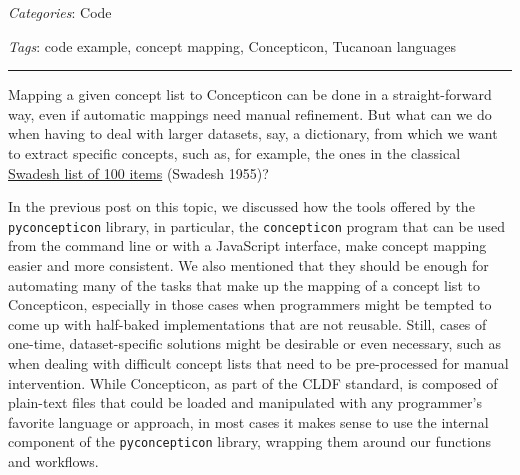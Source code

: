 \documentclass[
  a4paper,
  14pt,
  oneside,
  tablecaptionabove
]{scrbook}
\newcommand{\passthrough}[1]{#1}
\begin{document}
\emph{Categories}: Code

\emph{Tags}: code example, concept mapping, Concepticon, Tucanoan
languages

\begin{center}\rule{0.5\linewidth}{1pt}\end{center}


Mapping a given concept list to Concepticon can be done in a
straight-forward way, even if automatic mappings need manual refinement.
But what can we do when having to deal with larger datasets, say, a
dictionary, from which we want to extract specific concepts, such as,
for example, the ones in the classical
\href{https://concepticon.clld.org/contributions/Swadesh-1955-100}{Swadesh
list of 100 items} (Swadesh 1955)?

In the previous post on this topic, we discussed how the tools offered
by the \passthrough{\lstinline!pyconcepticon!} library, in particular,
the \passthrough{\lstinline!concepticon!} program that can be used from
the command line or with a JavaScript interface, make concept mapping
easier and more consistent. We also mentioned that they should be enough
for automating many of the tasks that make up the mapping of a concept
list to Concepticon, especially in those cases when programmers might be
tempted to come up with half-baked implementations that are not
reusable. Still, cases of one-time, dataset-specific solutions might be
desirable or even necessary, such as when dealing with difficult concept
lists that need to be pre-processed for manual intervention. While
Concepticon, as part of the CLDF standard, is composed of plain-text
files that could be loaded and manipulated with any programmer's
favorite language or approach, in most cases it makes sense to use the
internal component of the \passthrough{\lstinline!pyconcepticon!}
library, wrapping them around our functions and workflows.
\end{document}
